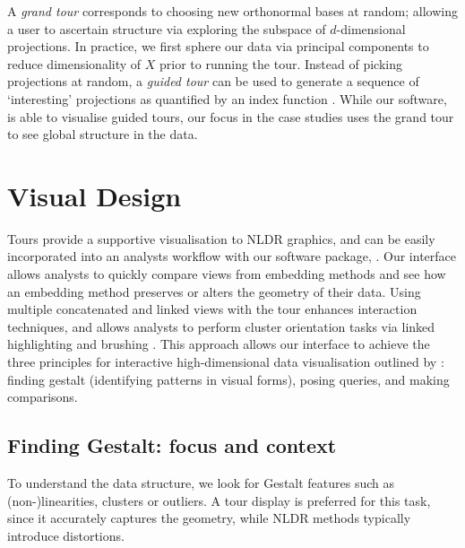 \documentclass[article,notitle]{jdssv}
\begin{document}
A \emph{grand tour} corresponds to choosing new orthonormal
bases at random; allowing a user to ascertain structure via exploring the
subspace of \(d\)-dimensional projections. In practice, we first sphere
our data via principal components to reduce dimensionality of \(X\) prior to
running the tour. Instead of picking projections at
random, a \emph{guided tour} can be used to generate a sequence of `interesting'
projections as quantified by an index function \citep{Cook1995-bi}. While our software,
 is able to visualise guided tours, our focus in the case studies
uses the grand tour to see global structure in the data.

\hypertarget{visual-design}{%
\section{Visual Design}\label{visual-design}}

Tours provide a supportive visualisation to NLDR graphics, and
can be easily incorporated into an analysts workflow with our software package,
. Our interface allows analysts to quickly compare
views from embedding methods and see how an embedding method
preserves or alters the geometry of their data. Using multiple concatenated and
linked views with the tour enhances interaction techniques, and allows
analysts to perform cluster orientation tasks via linked highlighting and
brushing \citep{McDonald1982-ew, Becker1987-gd}.
This approach allows our interface to achieve
the three principles for interactive high-dimensional data visualisation outlined
by \citet{Buja1996-fk}: finding gestalt (identifying patterns in visual forms), posing queries, and making comparisons.

\hypertarget{finding-gestalt-focus-and-context}{%
\subsection{Finding Gestalt: focus and context}\label{finding-gestalt-focus-and-context}}

To understand the data structure, we look for Gestalt features such as
(non-)linearities, clusters or outliers. A tour display is
preferred for this task, since it accurately captures the geometry, while NLDR
methods typically introduce distortions.
\end{document}
